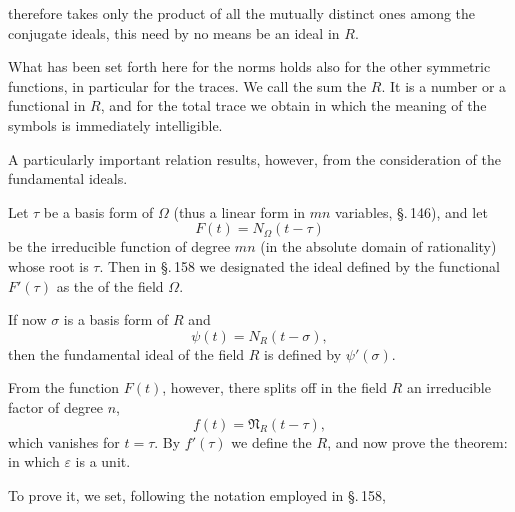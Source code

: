 therefore takes only the product of all the mutually distinct ones among the conjugate ideals, this need by no means be an ideal in $R$.

What has been set forth here for the norms holds also for the other symmetric functions, in particular for the traces. We call the sum
the  $R$. It is a number or a functional in $R$, and for the total trace we obtain
in which the meaning of the symbols is immediately intelligible.

A particularly important relation results, however, from the consideration of the fundamental ideals.

Let $\tau$ be a basis form of $\Omega$ (thus a linear form in $mn$ variables, \S.\,146), and let
\[
F(t) = N_\Omega(t - \tau)
\]
be the irreducible function of degree $mn$ (in the absolute domain of rationality) whose root is $\tau$. Then in \S.\,158 we designated the ideal defined by the functional $F'(\tau)$ as the  of the field $\Omega$.

If now $\sigma$ is a basis form of $R$ and
\[
\psi(t) = N_R(t - \sigma),
\]
then the fundamental ideal of the field $R$ is defined by $\psi'(\sigma)$.

From the function $F(t)$, however, there splits off in the field $R$ an irreducible factor of degree $n$,
\[
f(t) = \mathfrak{N}_R(t - \tau),
\]
which vanishes for $t = \tau$. By $f'(\tau)$ we define the  $R$, and now prove the theorem:
in which $\varepsilon$ is a unit.

To prove it, we set, following the notation employed in \S.\,158,
